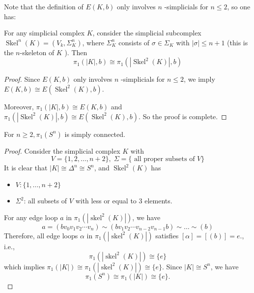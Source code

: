 Note that the definition of \(E\left( {K,b}\right)\) only involves \(n\) -simplicials for \(n \leq  2\), so one has:
\begin{proposition} For any simplicial complex \(K\), consider the simplicial subcomplex \({\operatorname{Skel}}^{n}\left( K\right)  = \left( {{V}_{k},\Sigma_{K}^{n}}\right)\), where \(\Sigma_{K}^{n}\) consists of \(\sigma  \in  \Sigma_{K}\) with \(\left| \sigma \right|  \leq  n + 1\) (this is the \(n\)-skeleton of \(K\) ). Then
\[
{\pi }_{1}\left( {\left| K\right|,b}\right)  \cong  {\pi }_{1}\left( {\left| {{\operatorname{Skel}}^{2}\left( K\right) }\right|,b}\right)
\]
\end{proposition}
\begin{proof} Since \(E\left( {K,b}\right)\) only involves \(n\) -simplicials for \(n \leq  2\), we imply \(E\left( {K,b}\right)  \cong  E\left( {{\operatorname{Skel}}^{2}\left( K\right),b}\right)\).

Moreover, \({\pi }_{1}\left( {\left| K\right|,b}\right)  \cong  E\left( {K,b}\right)\) and \({\pi }_{1}\left( {\left| {{\operatorname{Skel}}^{2}\left( K\right) }\right|,b}\right)  \cong  E\left( {{\operatorname{Skel}}^{2}\left( K\right),b}\right)\). So the proof is complete.
\end{proof}

\begin{corollary} \label{cor:Sn_simply_connected} For \(n \geq  2,{\pi}_{1}\left({S}^{n}\right)\) is simply connected.
\end{corollary}

\begin{proof} Consider the simplicial complex \(K\) with
\[
V = \{ 1,2,\ldots,n + 2\},\;\Sigma  = \{ \text{ all proper subsets of }V\}
\]
It is clear that \(\left| K\right|  \cong \Delta^n \cong  {S}^{n}\), and \({\operatorname{Skel}}^{2}\left( K\right)\) has

\begin{itemize}
\item \(V: \{ 1,\ldots,n + 2\}\)
\item \(\Sigma^{2}\): all subsets of \(V\) with less or equal to 3 elements.
\end{itemize}
For any edge loop \(a\) in \({\pi }_{1}\left( \left| {{\operatorname{skel}}^{2}\left( K\right) }\right| \right)\), we have
\[
a = \left( {b{v}_{0}{v}_{1}{v}_{2}\cdots {v}_{n}}\right)
\sim  \left( {b{v}_{1}{v}_{2}\cdots {v}_{n - 2}{v}_{n - 1}b}\right)
\sim \dots \sim  \left( b\right)
\]
Therefore, all edge loops \(\alpha\) in \({\pi }_{1}\left( \left| {{\operatorname{skel}}^{2}\left( K\right) }\right| \right)\) satisfies \(\left\lbrack  \alpha \right\rbrack   = \left\lbrack  \left( b\right) \right\rbrack   = e\)., i.e.,
\[
{\pi }_{1}\left( \left| {{\operatorname{skel}}^{2}\left( K\right) }\right| \right)  \cong  \{ e\}
\]
which implies \({\pi }_{1}\left( \left| K\right| \right)  \cong  {\pi }_{1}\left( \left| {{\operatorname{skel}}^{2}\left( K\right) }\right| \right)  \cong  \{ e\}\). Since \(\left| K\right|  \cong  {S}^{n}\), we have
\[
{\pi }_{1}\left( {S}^{n}\right)  \cong  {\pi }_{1}\left( \left| K\right| \right)  \cong  \{ e\}.
\]
\end{proof}

